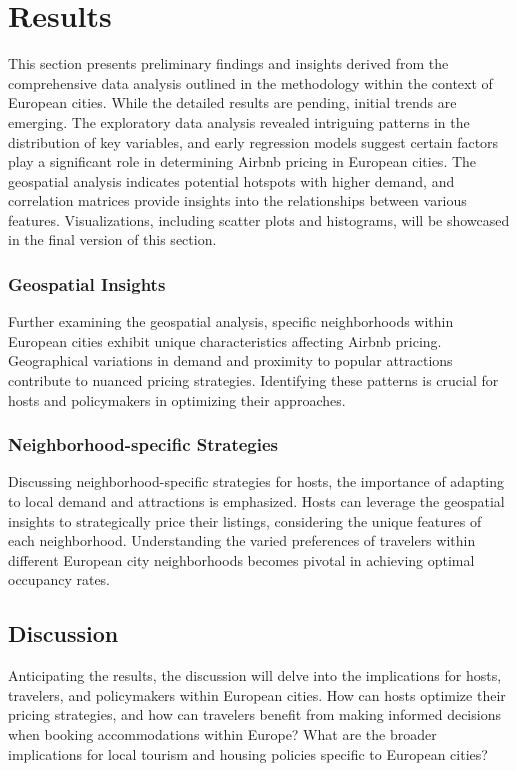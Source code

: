 \documentclass[12pt, letterpaper]{article}
\begin{document}
\section*{Results}
This section presents preliminary findings and insights derived from the comprehensive data analysis outlined in the methodology within the context of European cities. While the detailed results are pending, initial trends are emerging. The exploratory data analysis revealed intriguing patterns in the distribution of key variables, and early regression models suggest certain factors play a significant role in determining Airbnb pricing in European cities. The geospatial analysis indicates potential hotspots with higher demand, and correlation matrices provide insights into the relationships between various features. Visualizations, including scatter plots and histograms, will be showcased in the final version of this section.

\subsubsection*{Geospatial Insights}
Further examining the geospatial analysis, specific neighborhoods within European cities exhibit unique characteristics affecting Airbnb pricing. Geographical variations in demand and proximity to popular attractions contribute to nuanced pricing strategies. Identifying these patterns is crucial for hosts and policymakers in optimizing their approaches.

\subsubsection*{Neighborhood-specific Strategies}
Discussing neighborhood-specific strategies for hosts, the importance of adapting to local demand and attractions is emphasized. Hosts can leverage the geospatial insights to strategically price their listings, considering the unique features of each neighborhood. Understanding the varied preferences of travelers within different European city neighborhoods becomes pivotal in achieving optimal occupancy rates.

\subsection*{Discussion}
Anticipating the results, the discussion will delve into the implications for hosts, travelers, and policymakers within European cities. How can hosts optimize their pricing strategies, and how can travelers benefit from making informed decisions when booking accommodations within Europe? What are the broader implications for local tourism and housing policies specific to European cities?
\end{document}
